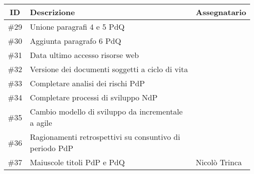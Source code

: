 \begin{center}
    \begin{tabular}{c|l|l}
        \rowcolor{pari_alt}
        \textbf{ID} & \textbf{Descrizione} & \textbf{Assegnatario} \\
        \midrule
        \#29 & Unione paragrafi 4 e 5 PdQ & \\
        \#30 & Aggiunta paragrafo 6 PdQ & \\
        \#31 & Data ultimo accesso risorse web & \\
        \#32 & Versione dei documenti soggetti a ciclo di vita & \\
        \#33 & Completare analisi dei rischi PdP & \\
        \#34 & Completare processi di sviluppo NdP & \\
        \#35 & Cambio modello di sviluppo da incrementale a agile & \\
        \#36 & Ragionamenti retrospettivi su consuntivo di periodo PdP & \\
        \#37 & Maiuscole titoli PdP e PdQ & Nicolò Trinca \\ 
    \end{tabular}
\end{center}